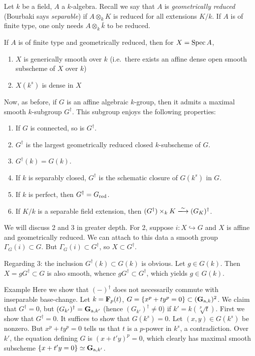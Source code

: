 Let $k$ be a field, $A$ a $k$-algebra. Recall we say that $A$ is 
\emph{geometrically reduced} (Bourbaki says \emph{separable}) if 
$A\otimes_k K$ is reduced for all extensions $K/k$. If $A$ is of finite 
type, one only needs $A\otimes_k \bar k$ to be reduced. 

If $A$ is of finite type and geometrically reduced, then for $X=\operatorname{Spec} A$, 
\begin{enumerate}
  \item $X$ is generically smooth over $k$ (i.e.\ there exists an 
    affine dense open smooth subscheme of $X$ over $k$)
  \item $X(k^s)$ is dense in $X$ 
\end{enumerate}

Now, as before, if $G$ is an affine algebraic $k$-group, then it admits a 
maximal smooth $k$-subgroup $G^\dagger$. This subgroup enjoys the following 
properties: 
\begin{enumerate}
  \item If $G$ is connected, so is $G^\dagger$. 
  \item $G^\dagger$ is the largest geometrically reduced closed $k$-subscheme of $G$. 
  \item $G^\dagger(k) = G(k)$. 
  \item If $k$ is separably closed, $G^\dagger$ is the schematic closure of 
    $G(k^s)$ in $G$. 
  \item If $k$ is perfect, then $G^\dagger = G_{\mathrm{red}}$. 
  \item If $K/k$ is a separable field extension, then 
    $(G^\dagger)\times_k K \isomorphism (G_K)^\dagger$. 
\end{enumerate}

We will discuss 2 and 3 in greater depth. For 2, suppose 
$i:X\hookrightarrow G$ and $X$ is affine and geometrically reduced. We can 
attach to this data a smooth group $\Gamma_G(i)\subset G$. But 
$\Gamma_G(i)\subset G^\dagger$, so $X\subset G^\dagger$. 

Regarding 3: the inclusion $G^\dagger(k)\subset G(k)$ is obvious. Let 
$g\in G(k)$. Then $X=g G^\dagger\subset G$ is also smooth, whence 
$g G^\dagger\subset G^\dagger$, which yields $g\in G(k)$. 

\begin{enonce}[remark]{Example}
Here we show that $(-)^\dagger$ does not necessarily commute with inseparable 
base-change. Let $k=\mathbf{F}_p(t)$, $G=\{x^p+t y^p=0\}\subset (\mathbf{G}_{\mathrm{a},k})^2$. 
We claim that $G^\dagger=0$, but $(G_{k'})^\dagger = \mathbf{G}_{\mathrm{a}, k'}$ (hence 
$(G_{k'})^\dagger \ne 0$) if $k'=k(\sqrt[p] t)$. 
First we show that $G^\dagger=0$. It suffices to show that $G(k^s)=0$. Let 
$(x,y)\in G(k^s)$ be nonzero. But $x^p+t y^p=0$ tells us that $t$ is a 
$p$-power in $k^s$, a contradiction. Over $k'$, the equation defining $G$ 
is $(x+t' y)^p=0$, which clearly has maximal smooth subscheme
$\{x+t' y=0\} \simeq \mathbf{G}_{\mathrm{a},k'}$. 
\end{enonce}


